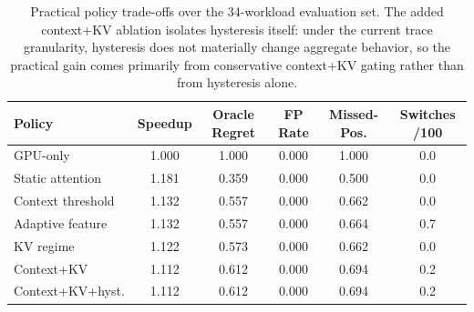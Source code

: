 \begin{table}[t]
\centering
\caption{Practical policy trade-offs over the 34-workload evaluation set. The added context+KV ablation isolates hysteresis itself: under the current trace granularity, hysteresis does not materially change aggregate behavior, so the practical gain comes primarily from conservative context+KV gating rather than from hysteresis alone.}
\label{tab:practical-policy}
\begin{tabular}{lccccc}
\toprule
Policy & Speedup & Oracle Regret & FP Rate & Missed-Pos. & Switches /100 \\
\midrule
GPU-only & 1.000 & 1.000 & 0.000 & 1.000 & 0.0 \\
Static attention & 1.181 & 0.359 & 0.000 & 0.500 & 0.0 \\
Context threshold & 1.132 & 0.557 & 0.000 & 0.662 & 0.0 \\
Adaptive feature & 1.132 & 0.557 & 0.000 & 0.664 & 0.7 \\
KV regime & 1.122 & 0.573 & 0.000 & 0.662 & 0.0 \\
Context+KV & 1.112 & 0.612 & 0.000 & 0.694 & 0.2 \\
Context+KV+hyst. & 1.112 & 0.612 & 0.000 & 0.694 & 0.2 \\
\bottomrule
\end{tabular}
\end{table}
